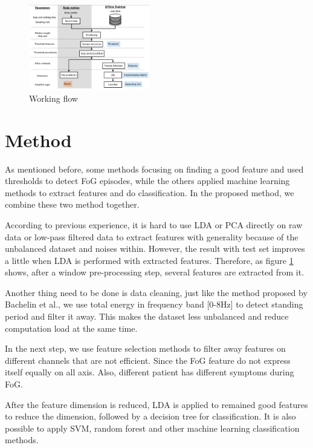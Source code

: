 \documentclass[article]{article}
\begin{document}
    
    \begin{figure}
    	\centering
    	\includegraphics[width=0.47\textwidth]{procedures}
    	\caption{Working flow}
    	 \label{fig:procedure}
    	
    \end{figure}
\section{Method}

As mentioned before, some methods focusing on finding a good feature and used thresholds to detect FoG episodes, while the others applied machine learning methods to extract features and do classification.
In the proposed method, we combine these two method together.

According to previous experience, it is hard to use LDA or PCA directly on raw data or low-pass filtered data to extract features with generality because of the unbalanced dataset and noises within.
However, the result with test set improves a little when LDA is performed with extracted features. Therefore, as figure \ref{fig:procedure} shows, after a window pre-processing step, several features are extracted from it.

Another thing need to be done is data cleaning, just like the method proposed by Bachelin et al.\cite{FI1}, we use total energy in frequency band [0-8Hz] to detect standing period and filter it away. This makes the dataset less unbalanced and reduce computation load at the same time.

In the next step,  we use feature selection methods to filter away features on different channels that are not efficient. Since the FoG feature do not express itself equally on all axis. Also, different patient has different symptoms during FoG.  

After the feature dimension is reduced, LDA is applied to remained good features to reduce the dimension, followed by a decision tree for classification. It is also possible to apply SVM, random forest and other machine learning classification methods. 
\end{document}
